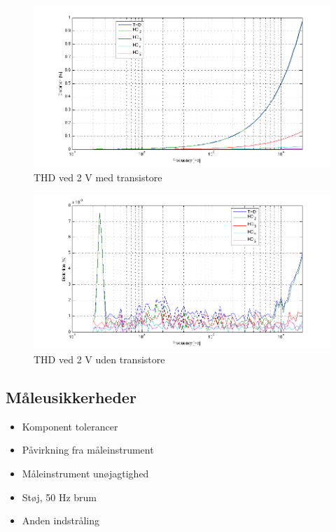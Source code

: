 \begin{figure}[h]
\centering
\includegraphics[width=\textwidth]{maalerapporter/indgangsvaelger/maalinger/opa/mic 2v opa muxudgang thd.png}
\caption{THD ved 2 V med transistore}
\label{fig:apind:2vm}
\end{figure}


\begin{figure}[h]
\centering
\includegraphics[width=\textwidth]{maalerapporter/indgangsvaelger/maalinger/opa/mic 2v opa muxudgang uden transistor thd.png}
\caption{THD ved 2 V uden transistore}
\label{fig:apind:2vu}
\end{figure}

\subsection*{Måleusikkerheder}
\begin{itemize}
\item Komponent tolerancer
\item Påvirkning fra måleinstrument
\item Måleinstrument unøjagtighed
\item Støj, 50 Hz brum
\item Anden indstråling
\end{itemize}